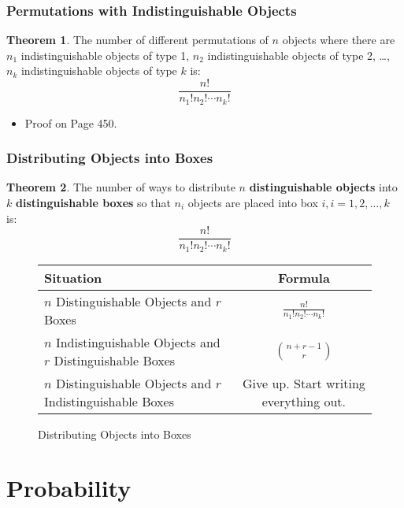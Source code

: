\documentclass[article, 11pt]{article}
\theoremstyle{definition}
\newtheorem{theorem}{Theorem}[subsubsection]
\newcommand{\df}{\displaystyle\frac} %
\begin{document}
    \subsubsection{Permutations with Indistinguishable Objects}
    \begin{theorem}
        The number of different permutations of $n$ objects where there are $n_1$ indistinguishable objects of type 1, $n_2$ indistinguishable objects of type 2, \ldots, $n_k$ indistinguishable objects of type $k$ is:
        \begin{equation*}
            \frac{n!}{n_1!n_2!\cdots n_k!}
        \end{equation*}
    \end{theorem}
    \begin{itemize}
        \item Proof on Page 450.
    \end{itemize}
    \subsubsection{Distributing Objects into Boxes}
    \begin{theorem}
        The number of ways to distribute $n$ \textbf{distinguishable objects} into $k$ \textbf{distinguishable boxes} so that $n_i$ objects are placed into box $i, i = 1, 2, \ldots, k$ is:
        \begin{equation*}
            \frac{n!}{n_1!n_2!\cdots n_k!}
        \end{equation*}
    \end{theorem}
    \begin{figure}[H]
        \centering
        {\renewcommand{\arraystretch}{2}
        \begin{tabular}{|l|c|}
            \hline
            Situation & Formula \\
            \hline
            $n$ Distinguishable Objects and $r$ Boxes & $\df{n!}{n_1!n_2!\cdots n_k!}$ \\
            $n$ Indistinguishable Objects and $r$ Distinguishable Boxes & $\displaystyle\binom{n + r - 1}{r}$ \\
            $n$ Distinguishable Objects and $r$ Indistinguishable Boxes & Give up. Start writing everything out. \\
            \hline
        \end{tabular}}
        \caption{Distributing Objects into Boxes}
    \end{figure}
    \section{Probability}
\end{document}
